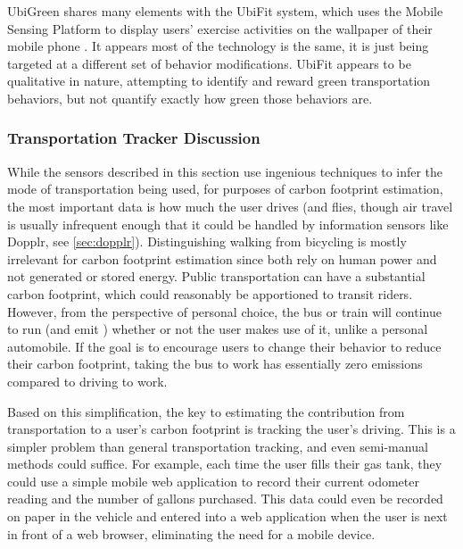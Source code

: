 UbiGreen shares many elements with the UbiFit system, which uses the Mobile Sensing Platform to display users' exercise activities on the wallpaper of their mobile phone \cite{Consolvo2008Flowers-or-robot}. It appears most of the technology is the same, it is just being targeted at a different set of behavior modifications. UbiFit appears to be qualitative in nature, attempting to identify and reward green transportation behaviors, but not quantify exactly how green those behaviors are.

\subsubsection{Transportation Tracker Discussion}

While the sensors described in this section use ingenious techniques to infer the mode of transportation being used, for purposes of carbon footprint estimation, the most important data is how much the user drives (and flies, though air travel is usually infrequent enough that it could be handled by information sensors like Dopplr, see \autoref{sec:dopplr}). Distinguishing walking from bicycling is mostly irrelevant for carbon footprint estimation since both rely on human power and not generated or stored energy. Public transportation can have a substantial carbon footprint, which could reasonably be apportioned to transit riders. However, from the perspective of personal choice, the bus or train will continue to run (and emit \COtwo) whether or not the user makes use of it, unlike a personal automobile. If the goal is to encourage users to change their behavior to reduce their carbon footprint, taking the bus to work has essentially zero emissions compared to driving to work.

Based on this simplification, the key to estimating the contribution from transportation to a user's carbon footprint is tracking the user's driving. This is a simpler problem than general transportation tracking, and even semi-manual methods could suffice. For example, each time the user fills their gas tank, they could use a simple mobile web application to record their current odometer reading and the number of gallons purchased. This data could even be recorded on paper in the vehicle and entered into a web application when the user is next in front of a web browser, eliminating the need for a mobile device.

